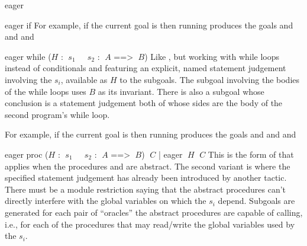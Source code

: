 \begin{tactic}{eager}
\begin{tsyntax}{eager if}
  \medskip
  For example, if the current goal is
   then
  running 
  produces the goals
  and
  and
  and
  \end{tsyntax}

  \begin{tsyntax}{eager while ($H$ : $\;s_1$ ~ $\;s_2$ :
    $\;A$ ==> $\;B$)}
  Like , but working with while loops instead of
  conditionals and featuring an explicit, named \prhl statement
  judgement involving the $s_i$, available as $H$ to the subgoals.
  The subgoal involving the bodies of the while loops uses $B$ as its
  invariant. There is also a subgoal whose conclusion is a \prhl
  statement judgement both of whose sides are the body of the second
  program's while loop.

  \medskip
  For example, if the current goal is
   then
  running 
  produces the goals
  and
  and
  and
  \end{tsyntax}

  \begin{tsyntax}{eager proc ($H$ : $\;s_1$ ~ $\;s_2$ :
    $\;A$ ==> $\;B$) $\;C$ | eager $\;H$ $\;C$}
  This is the form of  that applies when the procedures
   and  are abstract.  The second variant is
  where the specified \prhl statement judgement has already been
  introduced by another  tactic. There must be a module
  restriction saying that the abstract procedures can't directly
  interfere with the global variables on which the $s_i$
  depend. Subgoals are generated for each pair of ``oracles'' the
  abstract procedures are capable of calling, i.e., for each of the
  procedures that may read/write the global variables used by the
  $s_i$.


\end{tsyntax}
\end{tactic}
